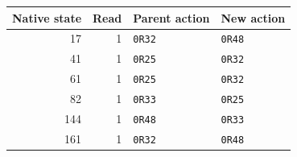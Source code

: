 \begin{center}\small
\begin{tabular}{rrll}
\toprule
Native state & Read & Parent action & New action\\
\midrule
17&1&\texttt{0R32}&\texttt{0R48}\\
41&1&\texttt{0R25}&\texttt{0R32}\\
61&1&\texttt{0R25}&\texttt{0R32}\\
82&1&\texttt{0R33}&\texttt{0R25}\\
144&1&\texttt{0R48}&\texttt{0R33}\\
161&1&\texttt{0R32}&\texttt{0R48}\\
\bottomrule
\end{tabular}
\end{center}
